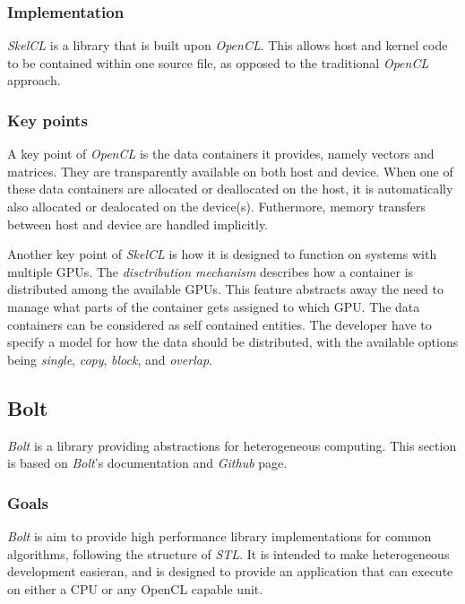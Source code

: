 \subsubsection{Implementation}
\textit{SkelCL} is a library that is built upon \textit{OpenCL}. This allows host and kernel code to be contained within one source file, as opposed to the traditional \textit{OpenCL} approach.

\subsubsection{Key points}
A key point of \textit{OpenCL} is the data containers it provides, namely vectors and matrices. They are transparently available on both host and device. When one of these data containers are allocated or deallocated on the host, it is automatically also allocated or dealocated on the device(s). Futhermore, memory transfers between host and device are handled implicitly.

Another key point of \textit{SkelCL} is how it is designed to function on systems with multiple GPUs. The \textit{disctribution mechanism} describes how a container is distributed among the available GPUs. This feature abstracts away the need to manage what parts of the container gets assigned to which GPU. The data containers can be considered as self contained entities. The developer have to specify a model for how the data should be distributed, with the available options being \textit{single}, \textit{copy}, \textit{block}, and \textit{overlap}.


\subsection{Bolt}
\textit{Bolt} is a library providing abstractions for heterogeneous computing. This section is based on \textit{Bolt}'s documentation\cite{boltDoc} and \textit{Github} page\cite{boltGithub}.

\subsubsection{Goals}
\textit{Bolt} is aim to provide high performance library implementations for common algorithms, following the structure of \textit{STL}. It is intended to make heterogeneous development easieran, and is designed to provide an application that can execute on either a CPU or any OpenCL capable unit.

